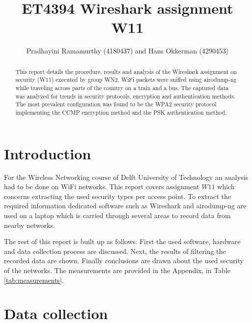 \documentclass[letterpaper, 10 pt, conference]{ieeeconf}  %
\title{\LARGE \bf
ET4394 Wireshark assignment W11
}
\author{Pradhayini Ramamurthy (4180437) and Hans Okkerman (4290453)%
}
\begin{document}
\maketitle
\thispagestyle{empty}
\pagestyle{empty}


\begin{abstract}

This report details the procedure, results and analysis of the Wireshark assignment on security (W11) executed by group WN2. WiFi packets were sniffed using airodump-ng while traveling across parts of the country on a train and a bus. The captured data was analyzed for trends in security protocols, encryption and authentication methods. The most prevalent configuration was found to be the WPA2 security protocol implementing the CCMP encryption method and the PSK authentication method.

\end{abstract}


\section{Introduction}
For the Wireless Networking course of Delft University of Technology an analysis had to be done on WiFi networks. This report covers assignment $W11$ which concerns extracting the used security types per access point. To extract the required information dedicated software such as Wireshark and airodump-ng are used on a laptop which is carried through several areas to record data from nearby networks. 

The rest of this report is built up as follows: First the used software, hardware and data collection process are discussed. Next, the results of filtering the recorded data are shown. Finally conclusions are drawn about the used security of the networks. The measurements are provided in the Appendix, in Table \ref{tab:measurements}.



\section{Data collection}
\end{document}
